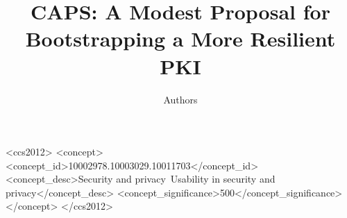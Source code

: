 \documentclass[sigconf, anonymous]{acmart}
\begin{document}
\title{
  CAPS: A Modest Proposal for Bootstrapping a More Resilient PKI
}
\author{
  Authors
}

\begin{abstract}
  
\end{abstract}

\begin{CCSXML}
<ccs2012>
<concept>
<concept_id>10002978.10003029.10011703</concept_id>
<concept_desc>Security and privacy~Usability in security and privacy</concept_desc>
<concept_significance>500</concept_significance>
</concept>
</ccs2012>
\end{CCSXML}



\maketitle

















\end{document}
